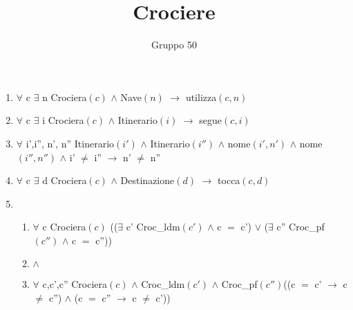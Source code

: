 \documentclass{article}
\begin{document}
\title{Crociere}
\author{Gruppo 50}
\date{}

\maketitle

\begin{enumerate}
    \item $\forall$ c $\exists$ n Crociera$(c)$ $\land$ Nave$(n)$ $\rightarrow$ utilizza$(c,n)$
    \item $\forall$ c $\exists$ i Crociera$(c)$ $\land$ Itinerario$(i)$ $\rightarrow$ segue$(c,i)$
    \item $\forall$ i',i'', n', n'' Itinerario$(i')$ $\land$ Itinerario$(i'')$ $\land$ nome$(i',n')$ $\land$ nome$(i'',n'')$ $\land$ i' $\neq$ i'' $\rightarrow$ n' $\neq$ n''
    \item $\forall$ c $\exists$ d Crociera$(c)$ $\land$ Destinazione$(d)$ $\rightarrow$ tocca$(c,d)$
    \item \begin{enumerate}
        \item $\forall$ c Crociera$(c)$ (($\exists$ c' Croc\_ldm$(c')$ $\land$ c $=$ c') $\lor$ ($\exists$ c'' Croc\_pf$(c'')$ $\land$ c $=$ c''))
        \item $\land$
        \item $\forall$ c,c',c'' Crociera$(c)$ $\land$ Croc\_ldm$(c')$ $\land$ Croc\_pf$(c'')$\newline ((c $=$ c' $\rightarrow$ c $\neq$ c'') $\land$ (c $=$ c'' $\rightarrow$ c $\neq$ c'))
    \end{enumerate}
\end{enumerate}
\end{document}
